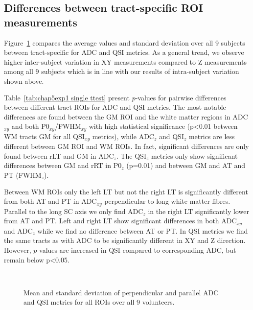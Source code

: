 \subsection{Differences between tract-specific ROI measurements}
Figure~\ref{fig:chapter5 exp1 vals} compares the average values and standard deviation over all 9 subjects between tract-specific for \gls{ADC} and \gls{QSI} metrics. As a general trend, we observe higher inter-subject variation in XY measurements compared to Z measurements among all 9 subjects which is in line with our results of intra-subject variation shown above.


Table~\ref{tab:chap5exp1 single ttest} present $p$-values for pairwise differences between different tract-\glspl{ROI} for ADC and \gls{QSI} metrics. The most notable differences are found between the GM \gls{ROI} and the white matter regions in ADC$_{xy}$ and both P0$_{xy}$/FWHM$_{xy}$ with high statistical significance (p<0.01 between WM tracts GM for all \gls{QSI}$_{xy}$ metrics), while ADC$_z$ and \gls{QSI}$_{z}$ metrics are less different between GM \gls{ROI} and WM \glspl{ROI}. In fact, significant differences are only found between rLT and GM in ADC$_z$. The \gls{QSI}$_z$ metrics only show significant differences between GM and rRT in P0$_z$ (p=0.01) and between GM and AT and PT (FWHM$_z$).


Between \gls{WM} \glspl{ROI} only the left LT but not the right LT is significantly different from both AT and PT in ADC$_{xy}$ perpendicular to long white matter fibres. Parallel to the long \gls{SC} axis we only find ADC$_{z}$ in the right LT significantly lower from AT and PT. Left and right LT show significant differences in both ADC$_{xy}$ and ADC$_{z}$ while we find no difference between AT or PT. In \gls{QSI} metrics we find the same tracts as with ADC to be significantly different in XY and Z direction. However, $p$-values are increased in \gls{QSI} compared to corresponding ADC, but remain below p<0.05.%
\begin{figure}[h!tp]
	\subfloat[]
	{
		\begin{minipage}{\linewidth}
		   \centering
		   
		\end{minipage}%
	}\\
	\subfloat[]
	{
		\begin{minipage}{\linewidth}
	   		
		\end{minipage}%
	}
   \caption{Mean and standard deviation of perpendicular and parallel ADC and QSI metrics for all ROIs over all 9 volunteers.}
   \label{fig:chapter5 exp1 vals}	
\end{figure}

